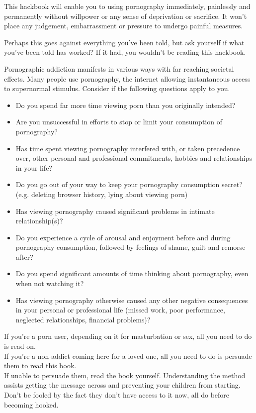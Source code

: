 \documentclass[easypeasy.tex]{subfiles}
\begin{document}
This hackbook will enable you to using pornography immediately, painlessly and permanently without willpower or any sense of deprivation or sacrifice. It won't place any judgement, embarrassment or pressure to undergo painful measures.

Perhaps this goes against everything you've been told, but ask yourself if what you've been told has worked? If it had, you wouldn't be reading this hackbook.

Pornographic addiction manifests in various ways with far reaching societal effects. Many people use pornography, the internet allowing instantaneous access to supernormal stimulus. Consider if the following questions apply to you.

\begin{itemize}
  \item Do you spend far more time viewing porn than you originally intended?
  \item Are you unsuccessful in efforts to stop or limit your consumption of pornography?
  \item Has time spent viewing pornography interfered with, or taken precedence over, other personal and professional commitments, hobbies and relationships in your life?
  \item Do you go out of your way to keep your pornography consumption secret? (e.g. deleting browser history, lying about viewing porn)
  \item Has viewing pornography caused significant problems in intimate relationship(s)?
  \item Do you experience a cycle of arousal and enjoyment before and during pornography consumption, followed by feelings of shame, guilt and remorse after?
  \item Do you spend significant amounts of time thinking about pornography, even when not watching it?
  \item Has viewing pornography otherwise caused any other negative consequences in your personal or professional life (missed work, poor performance, neglected relationships, financial problems)?
\end{itemize}

If you're a porn user, depending on it for masturbation or sex, all you need to do is read on. \\
If you're a non-addict coming here for a loved one, all you need to do is persuade them to read this book. \\
If unable to persuade them, read the book yourself. Understanding the method assists getting the message across and preventing your children from starting. Don't be fooled by the fact they don't have access to it now, all do before becoming hooked.
\end{document}
